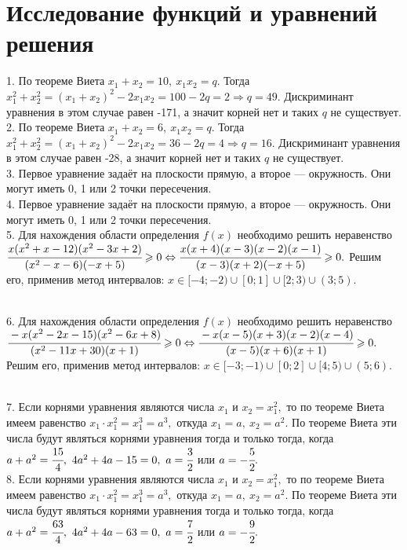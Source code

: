 \section{Исследование функций и уравнений решения}
1. По теореме Виета $x_1+x_2=10,\ x_1x_2=q.$ Тогда $x_1^2+x_2^2=(x_1+x_2)^2-2x_1x_2=100-2q=2\Rightarrow q=49.$ Дискриминант уравнения в этом случае равен -171, а значит корней нет и таких $q$ не существует.\\
2. По теореме Виета $x_1+x_2=6,\ x_1x_2=q.$ Тогда $x_1^2+x_2^2=(x_1+x_2)^2-2x_1x_2=36-2q=4\Rightarrow q=16.$ Дискриминант уравнения в этом случае равен -28, а значит корней нет и таких $q$ не существует.\\
3. Первое уравнение задаёт на плоскости прямую, а второе --- окружность. Они могут иметь 0, 1 или 2 точки пересечения.\\
4. Первое уравнение задаёт на плоскости прямую, а второе --- окружность. Они могут иметь 0, 1 или 2 точки пересечения.\\
5. Для нахождения области определения $f(x)$ необходимо решить неравенство\\ $\cfrac{x(x^2+x-12)(x^2-3x+2)}{(x^2-x-6)(-x+5)}\geqslant0
\Leftrightarrow \cfrac{x(x+4)(x-3)(x-2)(x-1)}{(x-3)(x+2)(-x+5)}\geqslant0.$ Решим его, применив метод интервалов:
$x\in[-4;-2)\cup[0;1]\cup[2;3)\cup(3;5).$
\begin{figure}[ht!]
\end{figure}\\
6. Для нахождения области определения $f(x)$ необходимо решить неравенство\\ $\cfrac{-x(x^2-2x-15)(x^2-6x+8)}{(x^2-11x+30)(x+1)}\geqslant0
\Leftrightarrow \cfrac{-x(x-5)(x+3)(x-2)(x-4)}{(x-5)(x+6)(x+1)}\geqslant0.$ Решим его, применив метод интервалов:
$x\in[-3;-1)\cup[0;2]\cup[4;5)\cup(5;6).$
\begin{figure}[ht!]
\end{figure}\\
7. Если корнями уравнения являются числа $x_1$ и $x_2=x_1^2,$ то по теореме Виета имеем равенство $x_1\cdot x_1^2=x_1^3=a^3,$ откуда $x_1=a,\ x_2=a^2.$ По теореме Виета эти числа будут являться корнями уравнения тогда и только тогда, когда $a+a^2=\cfrac{15}{4},\ 4a^2+4a-15=0,\ a=\cfrac{3}{2}$ или $a=-\cfrac{5}{2}.$\\
8. Если корнями уравнения являются числа $x_1$ и $x_2=x_1^2,$ то по теореме Виета имеем равенство $x_1\cdot x_1^2=x_1^3=a^3,$ откуда $x_1=a,\ x_2=a^2.$ По теореме Виета эти числа будут являться корнями уравнения тогда и только тогда, когда $a+a^2=\cfrac{63}{4},\ 4a^2+4a-63=0,\ a=\cfrac{7}{2}$ или $a=-\cfrac{9}{2}.$\\
